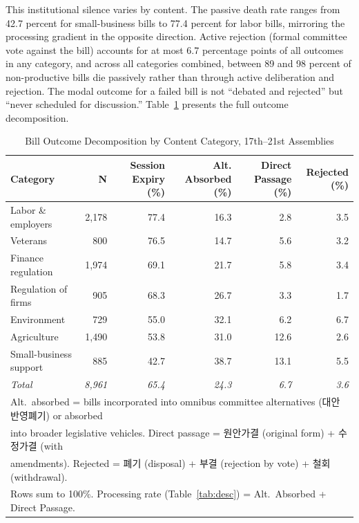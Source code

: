 \documentclass[11pt]{article}
\begin{document}
This institutional silence varies by content. The passive death rate ranges from 42.7 percent for small-business bills to 77.4 percent for labor bills, mirroring the processing gradient in the opposite direction. Active rejection (formal committee vote against the bill) accounts for at most 6.7 percentage points of all outcomes in any category, and across all categories combined, between 89 and 98 percent of non-productive bills die passively rather than through active deliberation and rejection. The modal outcome for a failed bill is not ``debated and rejected'' but ``never scheduled for discussion.'' Table~\ref{tab:decomp} presents the full outcome decomposition.

\begin{table}[htbp]
\centering
\caption{Bill Outcome Decomposition by Content Category, 17th--21st Assemblies}
\label{tab:decomp}
\begin{tabular}{lrrrrr}
\toprule
Category & N & Session Expiry (\%) & Alt. Absorbed (\%) & Direct Passage (\%) & Rejected (\%) \\
\midrule
Labor \& employers     & 2,178 & 77.4 & 16.3 & 2.8 & 3.5 \\
Veterans               &   800 & 76.5 & 14.7 & 5.6 & 3.2 \\
Finance regulation     & 1,974 & 69.1 & 21.7 & 5.8 & 3.4 \\
Regulation of firms    &   905 & 68.3 & 26.7 & 3.3 & 1.7 \\
Environment            &   729 & 55.0 & 32.1 & 6.2 & 6.7 \\
Agriculture            & 1,490 & 53.8 & 31.0 & 12.6 & 2.6 \\
Small-business support &   885 & 42.7 & 38.7 & 13.1 & 5.5 \\
\midrule
\textit{Total}         & \textit{8,961} & \textit{65.4} & \textit{24.3} & \textit{6.7} & \textit{3.6} \\
\bottomrule
\multicolumn{6}{l}{\footnotesize Alt.\ absorbed = bills incorporated into omnibus committee alternatives (대안반영폐기) or absorbed} \\
\multicolumn{6}{l}{\footnotesize into broader legislative vehicles. Direct passage = 원안가결 (original form) + 수정가결 (with} \\
\multicolumn{6}{l}{\footnotesize amendments). Rejected = 폐기 (disposal) + 부결 (rejection by vote) + 철회 (withdrawal).} \\
\multicolumn{6}{l}{\footnotesize Rows sum to 100\%. Processing rate (Table~\ref{tab:desc}) = Alt.\ Absorbed + Direct Passage.} \\
\end{tabular}
\end{table}
\end{document}
